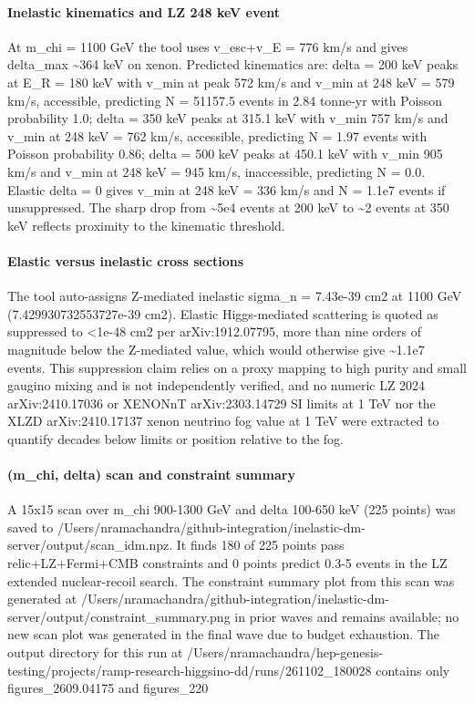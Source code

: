 \documentclass[11pt,a4paper]{article}
\begin{document}
\paragraph{Inelastic kinematics and LZ 248 keV event}
At m\_chi = 1100 GeV the tool uses v\_esc+v\_E = 776 km/s and gives delta\_max \textasciitilde{}364 keV on xenon. Predicted kinematics are: delta = 200 keV peaks at E\_R = 180 keV with v\_min at peak 572 km/s and v\_min at 248 keV = 579 km/s, accessible, predicting N = 51157.5 events in 2.84 tonne-yr with Poisson probability 1.0; delta = 350 keV peaks at 315.1 keV with v\_min 757 km/s and v\_min at 248 keV = 762 km/s, accessible, predicting N = 1.97 events with Poisson probability 0.86; delta = 500 keV peaks at 450.1 keV with v\_min 905 km/s and v\_min at 248 keV = 945 km/s, inaccessible, predicting N = 0.0. Elastic delta = 0 gives v\_min at 248 keV = 336 km/s and N = 1.1e7 events if unsuppressed. The sharp drop from \textasciitilde{}5e4 events at 200 keV to \textasciitilde{}2 events at 350 keV reflects proximity to the kinematic threshold.

\paragraph{Elastic versus inelastic cross sections}
The tool auto-assigns Z-mediated inelastic sigma\_n = 7.43e-39 cm2 at 1100 GeV (7.429930732553727e-39 cm2). Elastic Higgs-mediated scattering is quoted as suppressed to \textless{}1e-48 cm2 per arXiv:1912.07795, more than nine orders of magnitude below the Z-mediated value, which would otherwise give \textasciitilde{}1.1e7 events. This suppression claim relies on a proxy mapping to high purity and small gaugino mixing and is not independently verified, and no numeric LZ 2024 arXiv:2410.17036 or XENONnT arXiv:2303.14729 SI limits at 1 TeV nor the XLZD arXiv:2410.17137 xenon neutrino fog value at 1 TeV were extracted to quantify decades below limits or position relative to the fog.

\paragraph{(m\_chi, delta) scan and constraint summary}
A 15x15 scan over m\_chi 900-1300 GeV and delta 100-650 keV (225 points) was saved to /Users/nramachandra/github-integration/inelastic-dm-server/output/scan\_idm.npz. It finds 180 of 225 points pass relic+LZ+Fermi+CMB constraints and 0 points predict 0.3-5 events in the LZ extended nuclear-recoil search. The constraint summary plot from this scan was generated at /Users/nramachandra/github-integration/inelastic-dm-server/output/constraint\_summary.png in prior waves and remains available; no new scan plot was generated in the final wave due to budget exhaustion. The output directory for this run at /Users/nramachandra/hep-genesis-testing/projects/ramp-research-higgsino-dd/runs/261102\_180028 contains only figures\_2609.04175 and figures\_220
\end{document}

